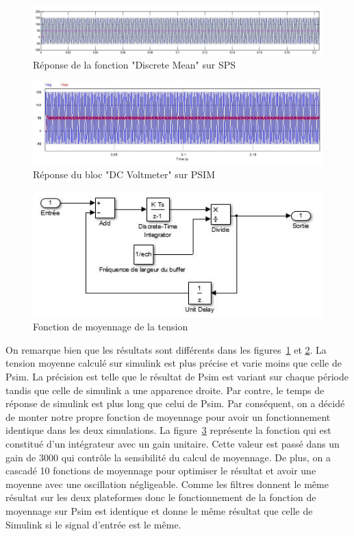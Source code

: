\documentclass[11pt,letterpaper,final]{report}
\begin{document}
\begin{figure}[h]
\centering
\includegraphics[scale=0.5]{fig/moy_sim.jpg}
\caption{Réponse de la fonction "Discrete Mean" sur SPS}
\label{dis_mean}
\end{figure}

\begin{figure}[h]
\centering
\includegraphics[scale=0.5]{fig/moy_psim.jpg}
\caption{Réponse du bloc "DC Voltmeter" sur PSIM}
\label{D_mean}
\end{figure}


\begin{figure}[ht]
\centering
\includegraphics[scale=0.8]{fig/moy.jpg}
\caption{Fonction de moyennage de la tension}
\label{moy}
\end{figure}
On remarque bien que les résultats sont différents dans les figures~\ref{dis_mean} et \ref{D_mean}. La tension moyenne calculé sur simulink est plus précise et varie moins que celle de Psim. La précision est telle que le résultat de Psim est variant sur chaque période tandis que celle de simulink a une apparence droite. Par contre, le temps de réponse de simulink est plus long que celui de Psim. Par conséquent, on a décidé de monter notre propre fonction de moyennage pour avoir un fonctionnement identique dans les deux simulations. La figure~\ref{moy} représente la fonction qui est constitué d'un intégrateur avec un gain unitaire. Cette valeur est passé dans un gain de 3000 qui contrôle la sensibilité du calcul de moyennage. De plus, on a cascadé 10 fonctions de moyennage pour optimiser le résultat et avoir une moyenne avec une oscillation négligeable. Comme les filtres donnent le même résultat sur les deux plateformes donc le fonctionnement de la fonction de moyennage sur Psim est identique et donne le même résultat que celle de Simulink si le signal d'entrée est le même. 
\end{document}
